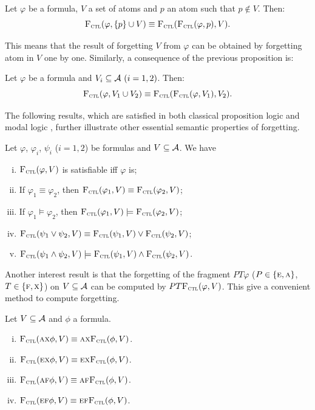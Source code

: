 \documentclass{article}
\begin{document}
\begin{proposition}\label{disTF}
Let $\varphi$ be a formula, $V$ a set of atoms and $p$ an atom such that $p \notin V$. Then:
\[
{\textsc{F}_{\textsc{ctl}}}(\varphi, \{p\} \cup V) \equiv {\textsc{F}_{\textsc{ctl}}}({\textsc{F}_{\textsc{ctl}}}(\varphi, p), V).
\]
\end{proposition}
This means that the result of forgetting $V$ from $\varphi$ can be obtained by forgetting atom in $V$ one by one.
Similarly, a consequence of the previous proposition is:

\begin{corollary}\label{disTFV}
Let $\varphi$ be a formula and $V_i\subseteq{\cal A}~(i=1,2)$. Then:
\[
{\textsc{F}_{\textsc{ctl}}}(\varphi, V_1 \cup V_2) \equiv {\textsc{F}_{\textsc{ctl}}}({\textsc{F}_{\textsc{ctl}}}(\varphi, V_1), V_2).
\]
\end{corollary}



The following results, which are satisfied in both classical proposition logic and modal logic \SFive, further illustrate other essential semantic properties of forgetting.
\begin{proposition}\label{pro:ctl:forget:1}
Let $\varphi$, $\varphi_i$, $\psi_i$ ($i=1,2$) be formulas and $V\subseteq {\cal A}$. We have
\begin{enumerate}[(i)]
  \item ${\textsc{F}_{\textsc{ctl}}}(\varphi, V)$ is satisfiable iff $\varphi$ is;
  \item If $\varphi_1 \equiv \varphi_2$, then ${\textsc{F}_{\textsc{ctl}}}(\varphi_1, V) \equiv {\textsc{F}_{\textsc{ctl}}}(\varphi_2, V)$;
  \item If $\varphi_1 \models \varphi_2$, then ${\textsc{F}_{\textsc{ctl}}}(\varphi_1, V) \models {\textsc{F}_{\textsc{ctl}}}(\varphi_2, V)$;
  \item ${\textsc{F}_{\textsc{ctl}}}(\psi_1 \vee \psi_2, V) \equiv {\textsc{F}_{\textsc{ctl}}}(\psi_1, V) \vee {\textsc{F}_{\textsc{ctl}}}(\psi_2, V)$;
  \item ${\textsc{F}_{\textsc{ctl}}}(\psi_1 \wedge \psi_2, V) \models {\textsc{F}_{\textsc{ctl}}}(\psi_1, V) \wedge {\textsc{F}_{\textsc{ctl}}}(\psi_2, V)$.
\end{enumerate}
\end{proposition}


Another interest result is that the forgetting of the fragment $P T \varphi$ ($P\in \{\textsc{e}, \textsc{a}\}$, $T \in \{\textsc{f}, \textsc{x}\}$) on $V\subseteq {\cal A}$ can be computed by $PT {\textsc{F}_{\textsc{ctl}}}(\varphi, V)$. This give a convenient method to compute forgetting.
\begin{proposition}\label{pro:ctl:forget:2}
  Let $V\subseteq\cal A$ and $\phi$ a formula.
  \begin{enumerate}[(i)]
    \item ${\textsc{F}_{\textsc{ctl}}}(\textsc{a}\textsc{x}\phi,V)\equiv\textsc{a}\textsc{x} {\textsc{F}_{\textsc{ctl}}}(\phi,V)$.
    \item ${\textsc{F}_{\textsc{ctl}}}(\textsc{e}\textsc{x}\phi,V)\equiv\textsc{e}\textsc{x} {\textsc{F}_{\textsc{ctl}}}(\phi,V)$.
    \item ${\textsc{F}_{\textsc{ctl}}}(\textsc{a}\textsc{f}\phi,V)\equiv\textsc{a}\textsc{f} {\textsc{F}_{\textsc{ctl}}}(\phi,V)$.
    \item ${\textsc{F}_{\textsc{ctl}}}(\textsc{e}\textsc{f}\phi,V)\equiv\textsc{e}\textsc{f} {\textsc{F}_{\textsc{ctl}}}(\phi,V)$.
  \end{enumerate}
\end{proposition}
\end{document}

